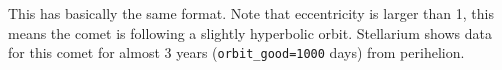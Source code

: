 This has basically the same format. Note that eccentricity is larger than 1,
this means the comet is following a slightly hyperbolic
orbit. Stellarium shows data for this comet for almost 3 years
(\texttt{orbit\_good=1000} days) from perihelion.





